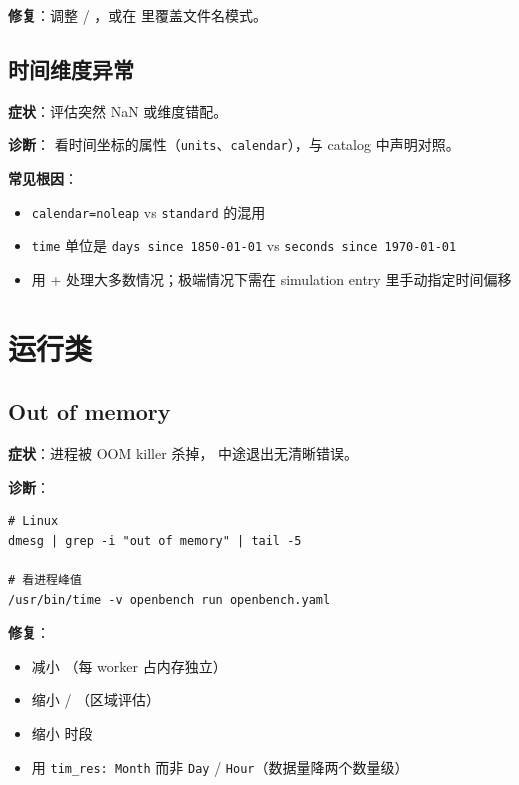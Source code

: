 \textbf{修复}：调整  / ，或在  里覆盖文件名模式。

\subsection{时间维度异常}

\textbf{症状}：评估突然 NaN 或维度错配。

\textbf{诊断}： 看时间坐标的属性（\texttt{units}、\texttt{calendar}），与 catalog 中声明对照。

\textbf{常见根因}：

\begin{itemize}
  \item \texttt{calendar=noleap} vs \texttt{standard} 的混用
  \item \texttt{time} 单位是 \texttt{days since 1850-01-01} vs \texttt{seconds since 1970-01-01}
  \item \openbench{} 用  +  处理大多数情况；极端情况下需在 simulation entry 里手动指定时间偏移
\end{itemize}

\section{运行类}

\subsection{Out of memory}

\textbf{症状}：进程被 OOM killer 杀掉， 中途退出无清晰错误。

\textbf{诊断}：

\begin{verbatim}
# Linux
dmesg | grep -i "out of memory" | tail -5

# 看进程峰值
/usr/bin/time -v openbench run openbench.yaml
\end{verbatim}

\textbf{修复}：

\begin{itemize}
  \item 减小 （每 worker 占内存独立）
  \item 缩小  / （区域评估）
  \item 缩小  时段
  \item 用 \texttt{tim\_res: Month} 而非 \texttt{Day} / \texttt{Hour}（数据量降两个数量级）
\end{itemize}

